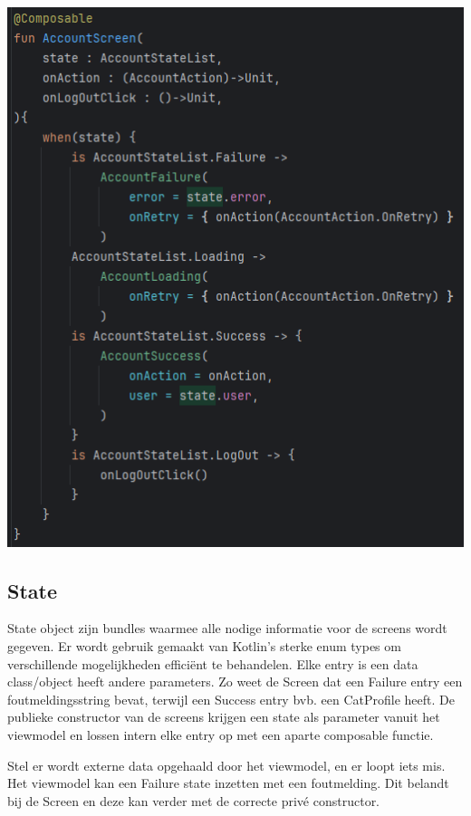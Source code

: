 \documentclass{report}
\begin{document}
\begin{center}
    \includegraphics{Screen_state}
\end{center}

\subsection{State}
State object zijn bundles waarmee alle nodige informatie voor de screens wordt gegeven.
Er wordt gebruik gemaakt van Kotlin's sterke enum types om verschillende mogelijkheden efficiënt te behandelen. Elke entry is een data class/object heeft andere parameters.
Zo weet de Screen dat een Failure entry een foutmeldingsstring bevat, terwijl een Success entry bvb. een CatProfile heeft.
De publieke constructor van de screens krijgen een state als parameter vanuit het viewmodel en lossen intern elke entry op met een aparte composable functie.

Stel er wordt externe data opgehaald door het viewmodel, en er loopt iets mis. Het viewmodel kan een Failure state inzetten met een foutmelding.
Dit belandt bij de Screen en deze kan verder met de correcte privé constructor.
\end{document}
